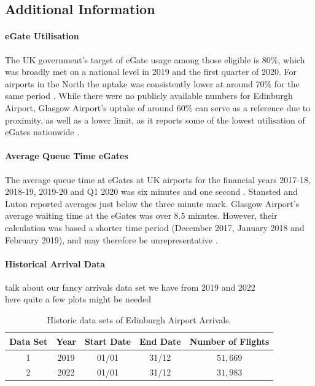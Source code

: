 \documentclass[10pt]{article}
\begin{document}
\subsection{Additional Information}

\paragraph{eGate Utilisation}
The UK government's target of eGate usage among those eligible is 80\%, which was broadly met on a national level in 2019 and the first quarter of 2020. For airports in the North the uptake was consistently lower at around 70\% for the same period \cite{Inspection_eGates}. While there were no publicly available numbers for Edinburgh Airport, Glasgow Airport's uptake of around 60\% can serve as a reference due to proximity, as well as a lower limit, as it reports some of the lowest utilisation of eGates nationwide \cite{Inspection_eGates}. 

\paragraph{Average Queue Time eGates}
The average queue time at eGates at UK airports for the financial years 2017-18, 2018-19, 2019-20 and Q1 2020 was six minutes and one second \cite{Inspection_eGates}. Stansted and Luton reported averages just below the three minute mark. Glasgow Airport's average waiting time at the eGates was over $8.5$ minutes. However, their calculation was based a shorter time period (December 2017, January 2018 and February 2019), and may therefore be unrepresentative \cite{Inspection_eGates}.


\paragraph{Historical Arrival Data}
talk about our fancy arrivals data set we have from 2019 and 2022 \\
here quite a few plots might be needed 


\begin{table}[!ht]
\caption{Historic data sets of Edinburgh Airport Arrivals.}
\label{tab_comdat_overview}
\centering
\begin{tabular}{ccccc}
\hline
\multicolumn{1}{c}{\textbf{Data Set}} & \textbf{Year} & \textbf{Start Date} & \textbf{End Date} & \textbf{Number of Flights} \\ \hline
1  & 2019  & 01/01  & 31/12    &  $51,669$  \\
2  & 2022  & 01/01  & 31/12    &  $31,983$  \\
 \hline
\end{tabular}
\end{table}
\end{document}
